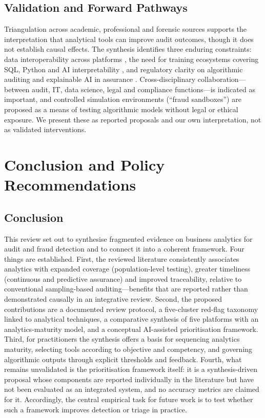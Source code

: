 \documentclass[conference]{IEEEtran}
\begin{document}
\subsection{Validation and Forward Pathways}

Triangulation across academic, professional and forensic sources supports the interpretation that analytical tools can improve audit outcomes, though it does not establish causal effects. The synthesis identifies three enduring constraints: data interoperability across platforms \cite{b64}, the need for training ecosystems covering SQL, Python and AI interpretability \cite{b65}, and regulatory clarity on algorithmic auditing and explainable AI in assurance \cite{b13}. Cross-disciplinary collaboration---between audit, IT, data science, legal and compliance functions---is indicated as important, and controlled simulation environments (``fraud sandboxes'') are proposed as a means of testing algorithmic models without legal or ethical exposure. We present these as reported proposals and our own interpretation, not as validated interventions.

\section{Conclusion and Policy Recommendations}
\label{sec:conclusion}

\subsection{Conclusion}

This review set out to synthesise fragmented evidence on business analytics for audit and fraud detection and to connect it into a coherent framework. Four things are established. First, the reviewed literature consistently associates analytics with expanded coverage (population-level testing), greater timeliness (continuous and predictive assurance) and improved traceability, relative to conventional sampling-based auditing---benefits that are reported rather than demonstrated causally in an integrative review. Second, the proposed contributions are a documented review protocol, a five-cluster red-flag taxonomy linked to analytical techniques, a comparative synthesis of five platforms with an analytics-maturity model, and a conceptual AI-assisted prioritisation framework. Third, for practitioners the synthesis offers a basis for sequencing analytics maturity, selecting tools according to objective and competency, and governing algorithmic outputs through explicit thresholds and feedback. Fourth, what remains unvalidated is the prioritisation framework itself: it is a synthesis-driven proposal whose components are reported individually in the literature but have not been evaluated as an integrated system, and no accuracy metrics are claimed for it. Accordingly, the central empirical task for future work is to test whether such a framework improves detection or triage in practice.
\end{document}

